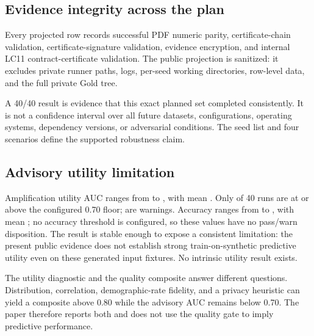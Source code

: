 \subsection{Evidence integrity across the plan}

Every projected row records successful PDF numeric parity, certificate-chain validation,
certificate-signature validation, evidence encryption, and internal LC11 contract-certificate
validation. The public
projection is sanitized: it excludes private runner paths, logs, per-seed working directories,
row-level data, and the full private Gold tree.

A 40/40 result is evidence that this exact planned set completed consistently. It is not a confidence
interval over all future datasets, configurations, operating systems, dependency versions, or
adversarial conditions. The seed list and four scenarios define the supported robustness claim.

\subsection{Advisory utility limitation}

Amplification utility AUC ranges from \UtilityMinAUC{} to \UtilityMaxAUC{}, with mean
\UtilityMeanAUC{}. Only \UtilityAtOrAboveFloor{} of 40 runs are at or above the configured 0.70
floor; \UtilityBelowFloor{} are warnings. Accuracy ranges from \UtilityMinAccuracy{} to
\UtilityMaxAccuracy{}, with mean \UtilityMeanAccuracy{}; no accuracy threshold is configured, so
these values have no pass/warn disposition. The result is stable enough to expose a consistent
limitation: the present public evidence does not establish strong train-on-synthetic predictive
utility even on these generated input fixtures. No intrinsic utility result exists.

The utility diagnostic and the quality composite answer different questions. Distribution,
correlation, demographic-rate fidelity, and a privacy heuristic can yield a composite above 0.80
while the advisory AUC remains below 0.70. The paper therefore reports both and does not use the
quality gate to imply predictive performance.
